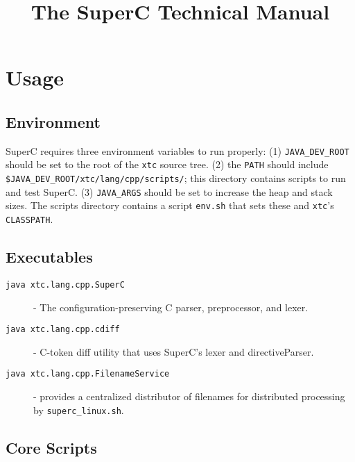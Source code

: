 \documentclass{article}
\newcommand{\SuperC}{{\textsf{Su\-perC}}}
\begin{document}
\title{The \SuperC{} Technical Manual}

\maketitle
\tableofcontents

\section{Usage}

\subsection{Environment}

SuperC requires three environment variables to run properly: (1)
\verb"JAVA_DEV_ROOT" should be set to the root of the \verb"xtc"
source tree.  (2) the \verb"PATH" should include
\verb"$JAVA_DEV_ROOT/xtc/lang/cpp/scripts/"; this directory contains
scripts to run and test \SuperC{}.  (3) \verb"JAVA_ARGS" should be set
to increase the heap and stack sizes.  The scripts directory contains
a script \verb"env.sh" that sets these and \verb"xtc"'s
\verb"CLASSPATH".

\subsection{Executables}

\begin{description}
\item[\texttt{java xtc.lang.cpp.SuperC}] - The
  configuration-preserving C parser, preprocessor, and lexer.

\item[\texttt{java xtc.lang.cpp.cdiff}] - C-token diff utility that
  uses SuperC's lexer and directiveParser.

\item[\texttt{java xtc.lang.cpp.FilenameService}] - provides a
  centralized distributor of filenames for distributed processing by
  \verb"superc_linux.sh".
\end{description}

\subsection{Core Scripts}
\end{document}
